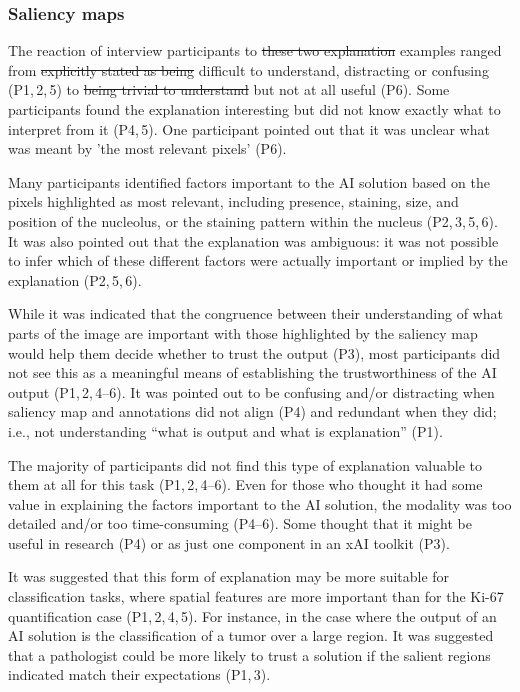 \documentclass[final,5p,times,twocolumn,hyphens]{elsarticle}
\providecommand{\DIFaddtex}[1]{{\protect\color{blue}\uwave{#1}}} %
\providecommand{\DIFdeltex}[1]{{\protect\color{red}\sout{#1}}}                      %
\providecommand{\DIFaddbegin}{} %
\providecommand{\DIFaddend}{} %
\providecommand{\DIFdelbegin}{} %
\providecommand{\DIFdelend}{} %
\providecommand{\DIFadd}[1]{\texorpdfstring{\DIFaddtex{#1}}{#1}} %
\providecommand{\DIFdel}[1]{\texorpdfstring{\DIFdeltex{#1}}{}} %
\newcommand{\DIFscaledelfig}{0.5}
\newlength{\DIFdelgraphicswidth} %
\newlength{\DIFdelgraphicsheight} %
\newcommand{\DIFaddincludegraphics}[2][]{{\color{blue}\fbox{\DIFOincludegraphics[#1]{#2}}}} %
\newcommand{\DIFdelincludegraphics}[2][]{%
\sbox{\DIFdelgraphicsbox}{\DIFOincludegraphics[#1]{#2}}%
\settoboxwidth{\DIFdelgraphicswidth}{\DIFdelgraphicsbox} %
\settoboxtotalheight{\DIFdelgraphicsheight}{\DIFdelgraphicsbox} %
\scalebox{\DIFscaledelfig}{%
\parbox[b]{\DIFdelgraphicswidth}{\usebox{\DIFdelgraphicsbox}\\[-\baselineskip] \rule{\DIFdelgraphicswidth}{0em}}\llap{\resizebox{\DIFdelgraphicswidth}{\DIFdelgraphicsheight}{%
\setlength{\unitlength}{\DIFdelgraphicswidth}%
\begin{picture}(1,1)%
\thicklines\linethickness{2pt} %
{\color[rgb]{1,0,0}\put(0,0){\framebox(1,1){}}}%
{\color[rgb]{1,0,0}\put(0,0){\line( 1,1){1}}}%
{\color[rgb]{1,0,0}\put(0,1){\line(1,-1){1}}}%
\end{picture}%
}\hspace*{3pt}}} %
} %
\DeclareRobustCommand{\DIFaddbegin}{\DIFOaddbegin \let\includegraphics\DIFaddincludegraphics} %
\DeclareRobustCommand{\DIFaddend}{\DIFOaddend \let\includegraphics\DIFOincludegraphics} %
\DeclareRobustCommand{\DIFdelbegin}{\DIFOdelbegin \let\includegraphics\DIFdelincludegraphics} %
\DeclareRobustCommand{\DIFdelend}{\DIFOaddend \let\includegraphics\DIFOincludegraphics} %
\begin{document}
\subsubsection{Saliency maps}

The reaction of interview participants to \DIFdelbegin \DIFdel{these two explanation }\DIFdelend \DIFaddbegin \DIFadd{the two saliency map }\DIFaddend examples ranged from \DIFdelbegin \DIFdel{explicitly stated as being }\DIFdelend difficult to understand, distracting \DIFaddbegin \DIFadd{and/}\DIFaddend or confusing (P1,\,2,\,5) to \DIFdelbegin \DIFdel{being trivial to understand }\DIFdelend \DIFaddbegin \DIFadd{trivially understandable }\DIFaddend but not at all useful (P6). Some participants found the explanation interesting but did not know exactly what to interpret from it (P4,\,5). One participant pointed out that it was unclear what was meant by 'the most relevant pixels' (P6).

Many participants identified factors important to the AI solution based on the pixels highlighted as most relevant, including presence, staining, size, and position of the nucleolus, or the staining pattern within the nucleus (P2,\,3,\,5,\,6). It was also pointed out that the explanation was ambiguous: it was not possible to infer which of these different factors were actually important or implied by the explanation (P2,\,5,\,6).

While it was indicated that the congruence between their understanding of what parts of the image are important with those highlighted by the saliency map would help them decide whether to trust the output (P3), most participants did not see this as a meaningful means of establishing the trustworthiness of the AI output (P1,\,2,\,4--6). It was pointed out to be confusing and/or distracting when saliency map and annotations did not align (P4) and redundant when they did; i.e., not understanding “what is output and what is explanation” (P1). 

The majority of participants did not find this type of explanation valuable to them at all for this task (P1,\,2,\,4--6). Even for those who thought it had some value in explaining the factors important to the AI solution, the modality was too detailed and/or too time-consuming (P4--6). Some thought that it might be useful in research (P4) or as just one component in an xAI toolkit (P3).

It was suggested that this form of explanation may be more suitable for classification tasks, where spatial features are more important than for the Ki-67 quantification case (P1,\,2,\,4,\,5). For instance, in the case where the output of an AI solution is the classification of a tumor over a large region. It was suggested that a pathologist could be more likely to trust a solution if the salient regions indicated match their expectations (P1,\,3).
\end{document}
